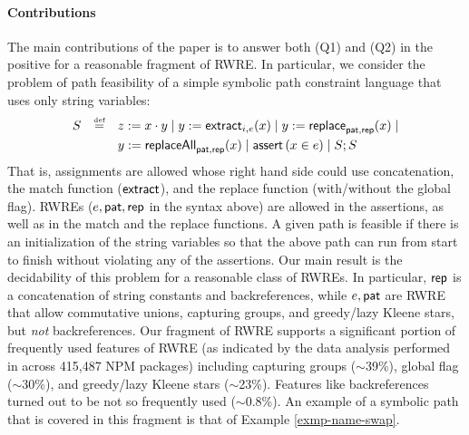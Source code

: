 



\paragraph*{Contributions}
The main contributions of the paper is to answer both (Q1) and (Q2) in the
positive for a reasonable fragment of RWRE. In particular, we consider the 
problem of path feasibility of a simple symbolic path constraint language
that uses only string variables:
\[
\begin{array}{l c l}
\smallskip
S & \eqdef  & z:= x \concat y \mid y := \extract_{i, e}(x) \mid  
y := \replace_{\pat, \rep}(x) \mid \\
& & y := \replaceall_{\pat, \rep}(x)   \mid 
 \ASSERT{x \in e} \mid S; S\
\label{eq:SL}
\end{array}
\]
That is, assignments are allowed whose right hand side could use concatenation,
the match function ($\mathsf{extract}$), and the replace function (with/without the 
global flag). RWREs ($e,\mathsf{pat},\mathsf{rep}$ in the syntax above) are allowed in the 
assertions, as well as in the match and the replace functions. A given path is
feasible if there is an initialization of the string variables so that the above
path can run from start to finish without violating any of the assertions.
Our main result is the decidability of this problem for a reasonable class of
RWREs. In particular, $\mathsf{rep}$ is a concatenation of string 
constants and backreferences, while $e, \mathsf{pat}$ are RWRE that allow commutative
unions, capturing groups, and greedy/lazy Kleene stars, but \emph{not} 
backreferences. Our fragment of RWRE supports a significant portion of
frequently used features of RWRE (as indicated by the data analysis performed in
\cite{LMK19} across 415,487 NPM packages) including capturing groups ($\sim$39\%), 
global flag ($\sim$30\%), and greedy/lazy Kleene stars ($\sim$23\%). Features
like backreferences turned out to be not so frequently used ($\sim$0.8\%).
An example of a symbolic path that is covered in this fragment is that of
Example \ref{exmp-name-swap}.

